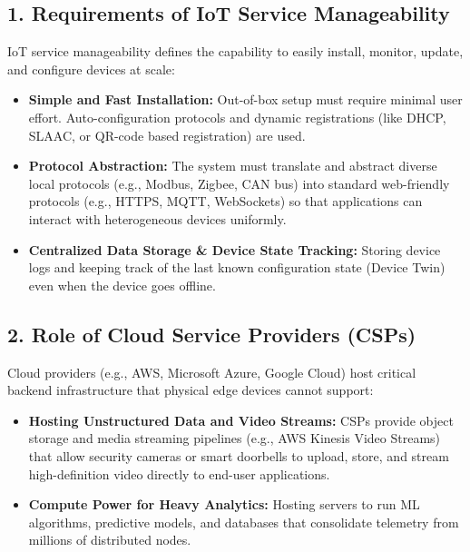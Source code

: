 \subsection{1. Requirements of IoT Service Manageability}
IoT service manageability defines the capability to easily install, monitor, update, and configure devices at scale:
\begin{itemize}
  \item   \textbf{Simple and Fast Installation:} Out-of-box setup must require minimal user effort. Auto-configuration protocols and dynamic registrations (like DHCP, SLAAC, or QR-code based registration) are used.
  \item   \textbf{Protocol Abstraction:} The system must translate and abstract diverse local protocols (e.g., Modbus, Zigbee, CAN bus) into standard web-friendly protocols (e.g., HTTPS, MQTT, WebSockets) so that applications can interact with heterogeneous devices uniformly.
  \item   \textbf{Centralized Data Storage \& Device State Tracking:} Storing device logs and keeping track of the last known configuration state (Device Twin) even when the device goes offline.
\end{itemize}

\subsection{2. Role of Cloud Service Providers (CSPs)}
Cloud providers (e.g., AWS, Microsoft Azure, Google Cloud) host critical backend infrastructure that physical edge devices cannot support:
\begin{itemize}
  \item   \textbf{Hosting Unstructured Data and Video Streams:} CSPs provide object storage and media streaming pipelines (e.g., AWS Kinesis Video Streams) that allow security cameras or smart doorbells to upload, store, and stream high-definition video directly to end-user applications.
  \item   \textbf{Compute Power for Heavy Analytics:} Hosting servers to run ML algorithms, predictive models, and databases that consolidate telemetry from millions of distributed nodes.
\end{itemize}

